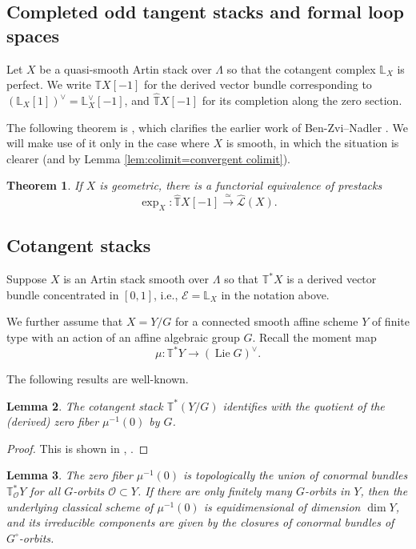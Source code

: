 \documentclass{amsart}
\newtheorem{theorem}{Theorem}[subsection]
\newtheorem{lemma}[theorem]{Lemma}
\theoremstyle{definition}
\theoremstyle{remark}
\numberwithin{equation}{section}
\DeclareMathOperator{\Lie}{Lie}
\newcommand{\mc}{\mathcal}
\newcommand{\T}{\mathbb{T}}
\renewcommand{\L}{\mathbb{L}}
\begin{document}
\subsection{Completed odd tangent stacks and formal loop spaces}

Let $X$ be a quasi-smooth Artin stack over $\Lambda$ so that the cotangent complex $\L_X$ is perfect. We write $\T X[-1]$ for the derived vector bundle corresponding to $(\L_X [1])^{\vee}=\L_X^{\vee}[-1]$, and $\widehat{\T}X[-1]$ for its completion along the zero section. 

The following theorem is \cite[Theorem A.3.4]{ElmantoKubrakSosnilo}, which clarifies the earlier work of Ben-Zvi--Nadler \cite[Theorem 6.9]{BenZviNadler}. We will make use of it only in the case where $X$ is smooth, in which the situation is clearer \cite[Remark 1.3.2]{ElmantoKubrakSosnilo} (and by Lemma \ref{lem:colimit=convergent colimit}). 

\begin{theorem}\label{thm:exp}
If $X$ is geometric, there is a functorial equivalence of prestacks 
\[
\exp_X\colon \widehat{\T} X[-1] \xrightarrow{\simeq} \widehat{\mathcal{L}}(X). 
\]
\end{theorem}

\subsection{Cotangent stacks}
Suppose $X$ is an Artin stack smooth over $\Lambda$ so that $\T^*X$ is a derived vector bundle concentrated in $[0,1]$, i.e., $\mathcal{E}=\L_X$ in the notation above. 

We further assume that $X=Y/G$ for a connected smooth affine scheme $Y$ of finite type with an action of an affine algebraic group $G$. Recall the moment map
\[
\mu\colon \T^* Y \to (\Lie G)^{\vee}. 
\]

The following results are well-known. 

\begin{lemma}
The cotangent stack $\T^* (Y/G)$ identifies with the quotient of the (derived) zero fiber $\mu^{-1}(0)$ by $G$. 
\end{lemma}

\begin{proof}
This is shown in \cite[\S4.3]{BeniniSafronovSchenkel}, \cite[\S3.1]{BeniniPridhamSchenkel}.    
\end{proof}

\begin{lemma}
The zero fiber $\mu^{-1}(0)$ is topologically the union of conormal bundles $\T^*_{\mc O}Y$ for all $G$-orbits $\mc O\subset Y$. If there are only finitely many $G$-orbits in $Y$, then the underlying classical scheme of $\mu^{-1}(0)$ is equidimensional of dimension $\dim Y$, and its irreducible components are given by the closures of conormal bundles of $G^\circ$-orbits. 
\end{lemma}
\end{document}
